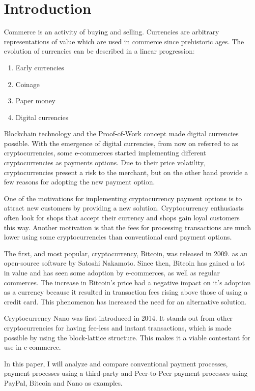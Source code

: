 \documentclass{ferseminar}
\begin{document}
\stvoripredstranice
\section{Introduction}
Commerce is an activity of buying and selling. Currencies are arbitrary representations of value which are used in commerce since prehistoric ages. The evolution of currencies can be described in a linear progression:

\begin{enumerate}
	\item Early currencies
	\item Coinage
	\item Paper money
	\item Digital currencies
\end{enumerate}

Blockchain technology and the Proof-of-Work concept made digital currencies possible. With the emergence of digital currencies, from now on referred to as cryptocurrencies, some e-commerces started implementing different cryptocurrencies as payments options. Due to their price volatility, cryptocurrencies present a risk to the merchant, but on the other hand provide a few reasons for adopting the new payment option.

One of the motivations for implementing cryptocurrency payment options is to attract new customers by providing a new solution. Cryptocurrency enthusiasts often look for shops that accept their currency and shops gain loyal customers this way. Another motivation is that the fees for processing transactions are much lower using some cryptocurrencies than conventional card payment options.

The first, and most popular, cryptocurrency, Bitcoin, was released in 2009. as an open-source software by Satoshi Nakamoto. Since then, Bitcoin has gained a lot in value and has seen some adoption by e-commerces, as well as regular commerces. The increase in Bitcoin's price had a negative impact on it's adoption as a currency because it resulted in transaction fees rising above those of using a credit card. This phenomenon has increased the need for an alternative solution.

Cryptocurrency Nano was first introduced in 2014. It stands out from other cryptocurrencies for having fee-less and instant transactions, which is made possible by using the block-lattice structure. This makes it a viable contestant for use in e-commerce.

In this paper, I will analyze and compare conventional payment processes, payment processes using a third-party and Peer-to-Peer payment processes using PayPal, Bitcoin and Nano as examples.
\end{document}
